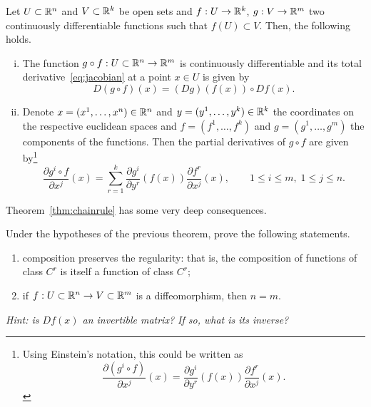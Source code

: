 \begin{theorem}\label{thm:chainrule}
  Let $U\subset\mathbb{R}^n$ and $V\subset\mathbb{R}^k$ be open sets and $f: U \to \mathbb{R}^k$, $g: V\to\mathbb{R}^m$ two continuously differentiable functions such that $f(U)\subset V$.
  Then, the following holds.
  \begin{enumerate}[(i)]
    \item\label{thm:chainrule1} The function $g\circ f: U\subset\mathbb{R}^n \to\mathbb{R}^m$ is continuously differentiable and its total derivative~\eqref{eq:jacobian} at a point $x\in U$ is given by
          \begin{equation}
            D(g\circ f)(x) = (Dg)(f(x)) \circ Df(x).
          \end{equation}
    \item\label{thm:chainrule2} Denote $x=(x^1, \ldots, x^n)\in\mathbb{R}^n$ and $y=(y^1,\ldots,y^k)\in\mathbb{R}^k$ the coordinates on the respective euclidean spaces and $f=(f^1,\ldots,f^k)$ and $g=(g^1,\ldots,g^m)$ the components of the functions. Then the partial derivatives of $g\circ f$ are given by\footnote{Using Einstein's notation, this could be written as \begin{equation}\frac{\partial (g^i\circ f)}{\partial x^j}(x) = \frac{\partial g^i}{\partial y^r}(f(x)) \frac{\partial f^r}{\partial x^j}(x).\end{equation}}
          \begin{equation}
            \frac{\partial g^i\circ f}{\partial x^j}(x)
            = \sum_{r=1}^k \frac{\partial g^i}{\partial y^r}(f(x)) \frac{\partial f^r}{\partial x^j}(x),
            \qquad 1\leq i \leq m,\; 1\leq j\leq n.
          \end{equation}
  \end{enumerate}
\end{theorem}

Theorem~\ref{thm:chainrule} has some very deep consequences.
\begin{exercise}
  Under the hypotheses of the previous theorem, prove the following statements.
  \begin{enumerate}
    \item composition preserves the regularity: that is, the composition of functions of class $C^r$ is itself a function of class $C^r$;
    \item if $f:U\subset\mathbb{R}^n\to V\subset\mathbb{R}^m$ is a diffeomorphism, then $n=m$.
  \end{enumerate}
  \textit{\small Hint: is $Df(x)$ an invertible matrix? If so, what is its inverse?} %
\end{exercise}

